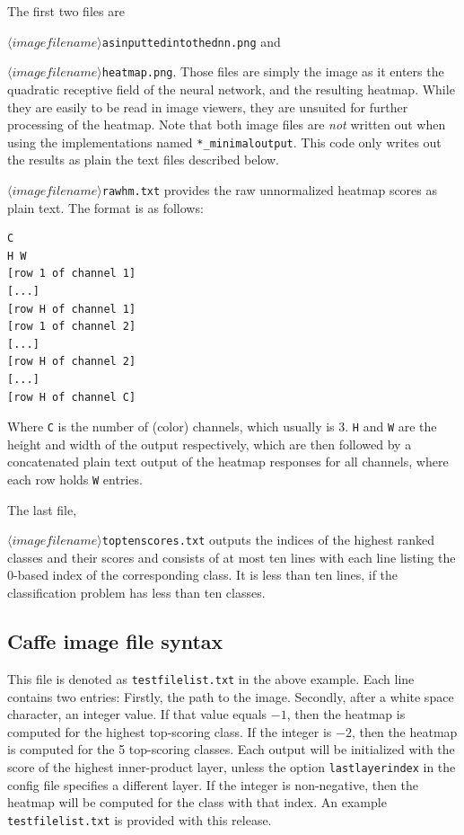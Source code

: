 \documentclass[a4wide]{article}
\begin{document}
The first two files are

\texttt{$\langle imagefilename\rangle$\textunderscore as\textunderscore inputted\textunderscore into\textunderscore the\textunderscore dnn.png} and

\texttt{$\langle imagefilename\rangle$\textunderscore heatmap.png}. Those files are simply the image as it enters the quadratic receptive field of the neural network, and the resulting heatmap. While they are easily to be read in image viewers, they are unsuited for further processing of the heatmap. Note that both image files are \emph{not} written out when using the implementations named \texttt{*\_minimaloutput}. This code only writes out the results as plain the text files described below.


\texttt{$\langle imagefilename\rangle$\textunderscore rawhm.txt} provides the raw unnormalized heatmap scores as plain text.
The format is as follows:

\begin{Verbatim}[frame=single]
C
H W
[row 1 of channel 1]
[...]
[row H of channel 1]
[row 1 of channel 2]
[...]
[row H of channel 2]
[...]
[row H of channel C]
\end{Verbatim}

Where \texttt{C} is the number of (color) channels, which usually is 3. \texttt{H} and \texttt{W} are the height and width of the output respectively, which are then followed by a concatenated plain text output of the heatmap responses for all channels, where each row holds \texttt{W} entries.


The last file,

\texttt{$\langle imagefilename\rangle$\textunderscore toptenscores.txt} outputs the indices of the highest ranked classes and their scores and consists of at most ten lines with each line listing the 0-based index of the corresponding class. It is less than ten lines, if the classification problem has less than ten classes.


\subsection*{Caffe image file syntax}

This file is denoted as \texttt{testfilelist.txt} in the above example. Each line contains two entries: Firstly, the path to the image. Secondly, after a white space character, an integer value.
If that value equals $-1$, then the heatmap is computed for the highest top-scoring class. If the integer is $-2$, then the heatmap is computed for the 5 top-scoring classes. Each output will be initialized with the score of the highest inner-product layer, unless the option \texttt{lastlayerindex} in the config file specifies a different layer. If the integer is non-negative, then the heatmap will be computed for the class with that index. An example \texttt{testfilelist.txt} is provided with this release.
\end{document}
